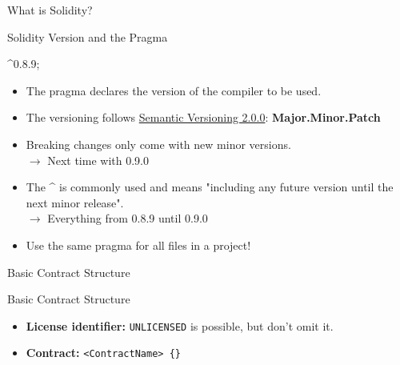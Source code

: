 \documentclass[handout]{beamer}
\begin{document}
\begin{frame}{What is Solidity?}
\vspace{1em}
	

\end{frame}


\begin{frame}{Solidity Version and the Pragma}

\^{}0.8.9;	

\vspace{1em}

	\begin{itemize}
		\item<1-> The pragma declares the version of the compiler to be used.
 		\item<2-> The versioning follows \link \href{https://semver.org/}{Semantic Versioning 2.0.0}: \textbf{Major.Minor.Patch}
 		\item<3-> Breaking changes only come with new minor versions. \\ {\small $\rightarrow$ Next time with 0.9.0}
		\item<4-> The \textbf{\^{}} is commonly used and means "including any future version until the next minor release". \\ %
 {$\rightarrow$ \small Everything from 0.8.9 until 0.9.0}
 		\item<5-> Use the same pragma for all files in a project!
	\end{itemize}
	
\end{frame}


\begin{frame}{Basic Contract Structure}

	\begin{samplecode}{Basic Contract Structure}
		
	\end{samplecode}
	\vspace{1em}
	\begin{itemize}
		\item \textbf{License identifier:} \texttt{UNLICENSED} is possible, but don't omit it.
		\item \textbf{Contract:} \texttt{<ContractName> \{\}}
	\end{itemize}

\end{frame}
\end{document}
